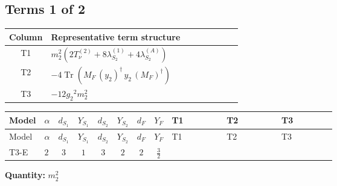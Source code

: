 \documentclass[8pt]{article}
\begin{document}
\begin{landscape}
\subsection*{Terms 1 of 2}
\begin{center}
\begin{tabular}{@{}c >{\raggedright\arraybackslash}p{0.82\linewidth}@{}}
\toprule
Column & Representative term structure \\
\midrule
T1 & \(\displaystyle {m_2^2} (2 T_{\nu}^{(2)}+8 {\lambda_{S_2}^{(1)}}+4 {\lambda_{S_2}^{(A)}})\) \\
\midrule
T2 & \(\displaystyle -4 \operatorname{Tr}\!\left({M_F}\,\left({y_2}\right)^{\dagger}\,{y_2}\,\left({M_F}\right)^{\dagger}\right)\) \\
\midrule
T3 & \(\displaystyle -12 {g_2}^2 {m_2^2}\) \\
\midrule
\bottomrule
\end{tabular}
\end{center}
\smallskip
\tiny
\begin{longtable}{@{}llcccccc >{\raggedright\arraybackslash}p{0.21\linewidth} >{\raggedright\arraybackslash}p{0.21\linewidth} >{\raggedright\arraybackslash}p{0.21\linewidth}@{}}
\toprule
Model & $\alpha$ & $d_{S_1}$ & $Y_{S_1}$ & $d_{S_2}$ & $Y_{S_2}$ & $d_F$ & $Y_F$ & T1 & T2 & T3 \\
\midrule
\endfirsthead
\toprule
Model & $\alpha$ & $d_{S_1}$ & $Y_{S_1}$ & $d_{S_2}$ & $Y_{S_2}$ & $d_F$ & $Y_F$ & T1 & T2 & T3 \\
\midrule
\endhead
T3-E & $2$ & $3$ & $1$ & $3$ & $2$ & $2$ & $\frac{3}{2}$ & \scriptsize\adjustbox{max width=\linewidth}{$\begin{gathered} {m_2^2} (2 T_{\nu}^{(2)}+8 {\lambda_{S_2}^{(1)}}+4 {\lambda_{S_2}^{(A)}})\end{gathered}$} & \scriptsize\adjustbox{max width=\linewidth}{$\begin{gathered} -4 \operatorname{Tr}\!\left({M_F}\,\left({y_2}\right)^{\dagger}\,{y_2}\,\left({M_F}\right)^{\dagger}\right)\end{gathered}$} & \scriptsize\adjustbox{max width=\linewidth}{$\begin{gathered} -12 {g_2}^2 {m_2^2}\end{gathered}$} \\
\midrule
\bottomrule
\end{longtable}
\clearpage
\noindent\textbf{Quantity: }$m_2^2$\par\smallskip

\end{landscape}
\end{document}
